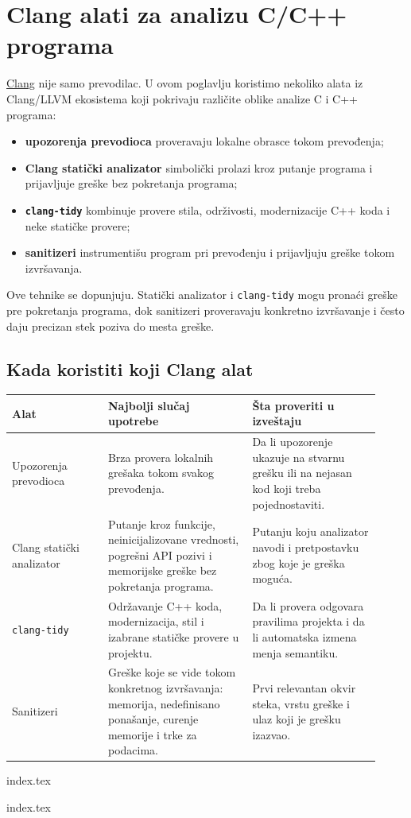 \section{Clang alati za analizu C/C++ programa}\label{clang-alati-za-analizu-c-cpp-programa}

\href{https://clang.llvm.org/}{Clang} nije samo prevodilac. U ovom poglavlju koristimo nekoliko alata iz Clang/LLVM ekosistema koji pokrivaju različite oblike analize C i C++ programa:

\begin{itemize}
\tightlist
\item
  \textbf{upozorenja prevodioca} proveravaju lokalne obrasce tokom prevođenja;
\item
  \textbf{Clang statički analizator} simbolički prolazi kroz putanje programa i prijavljuje greške bez pokretanja programa;
\item
  \textbf{\texttt{clang-tidy}} kombinuje provere stila, održivosti, modernizacije C++ koda i neke statičke provere;
\item
  \textbf{sanitizeri} instrumentišu program pri prevođenju i prijavljuju greške tokom izvršavanja.
\end{itemize}

Ove tehnike se dopunjuju. Statički analizator i \texttt{clang-tidy} mogu pronaći greške pre pokretanja programa, dok sanitizeri proveravaju konkretno izvršavanje i često daju precizan stek poziva do mesta greške.

\subsection{Kada koristiti koji Clang alat}\label{kada-koristiti-koji-clang-alat}

\begin{longtable}{@{}p{0.24\linewidth}p{0.36\linewidth}p{0.32\linewidth}@{}}
\toprule
Alat & Najbolji slučaj upotrebe & Šta proveriti u izveštaju \\
\midrule
\endhead
Upozorenja prevodioca & Brza provera lokalnih grešaka tokom svakog prevođenja. & Da li upozorenje ukazuje na stvarnu grešku ili na nejasan kod koji treba pojednostaviti. \\
Clang statički analizator & Putanje kroz funkcije, neinicijalizovane vrednosti, pogrešni API pozivi i memorijske greške bez pokretanja programa. & Putanju koju analizator navodi i pretpostavku zbog koje je greška moguća. \\
\texttt{clang-tidy} & Održavanje C++ koda, modernizacija, stil i izabrane statičke provere u projektu. & Da li provera odgovara pravilima projekta i da li automatska izmena menja semantiku. \\
Sanitizeri & Greške koje se vide tokom konkretnog izvršavanja: memorija, nedefinisano ponašanje, curenje memorije i trke za podacima. & Prvi relevantan okvir steka, vrstu greške i ulaz koji je grešku izazvao. \\
\bottomrule
\end{longtable}

{index.tex}

{index.tex}
